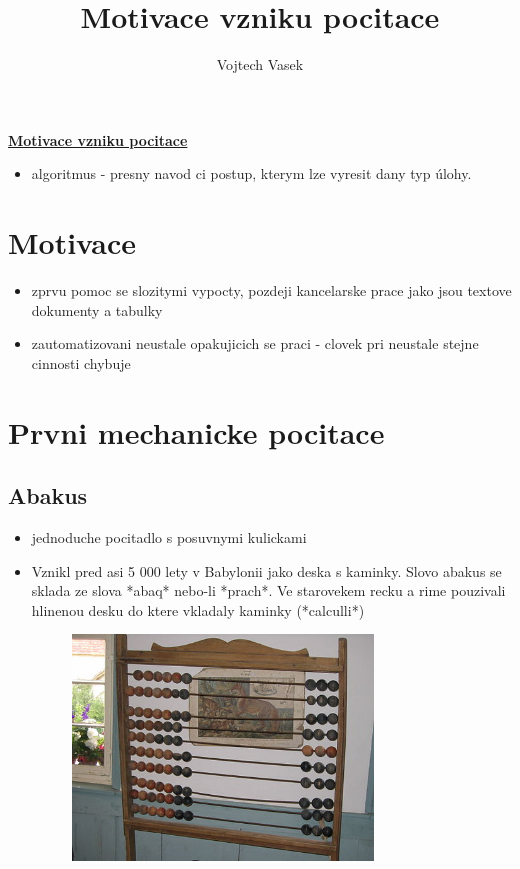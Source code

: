 \documentclass[a4paper,12pt]{article}
\title{Motivace vzniku pocitace}
\author{Vojtech Vasek}
\begin{document}
\begin{center}
    \huge{\underline{\textbf{Motivace vzniku pocitace}}}
\end{center}

\begin{itemize}\item{algoritmus - presny navod ci postup, kterym lze vyresit dany typ úlohy.}\end{itemize}

\section{Motivace}
    \begin{itemize}
        \item{zprvu pomoc se slozitymi vypocty, pozdeji kancelarske prace jako jsou textove dokumenty a tabulky}
        \item{zautomatizovani neustale opakujicich se praci - clovek pri neustale stejne cinnosti chybuje}
    \end{itemize}

\section{Prvni mechanicke pocitace}
    \subsection{Abakus}
        \begin{itemize}
            \item{jednoduche pocitadlo s posuvnymi kulickami}
            \item{Vznikl pred asi 5 000 lety v Babylonii jako deska s kaminky. Slovo abakus se sklada ze slova *abaq* nebo-li *prach*. Ve starovekem recku a rime pouzivali hlinenou desku do ktere vkladaly kaminky (*calculli*)}
            \begin{figure}[htp]
                \centering
                \includegraphics[width=8cm]{TVP_11_9_23@2.jpg}
            \end{figure}
        \end{itemize}
\end{document}
